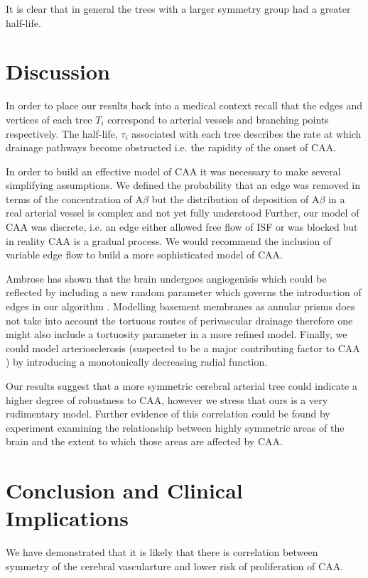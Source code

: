 \documentclass[10pt]{amsart} %
\theoremstyle{definition}
\begin{document}
It is clear that in general the trees with a larger symmetry group had a greater half-life.

\section{Discussion}

In order to place our results back into a medical context recall that the edges and vertices of each tree $T_i$ correspond to arterial vessels and branching points respectively.  The half-life, $\tau_i$ associated with each tree describes the rate at which drainage pathways become obstructed i.e. the rapidity of the onset of CAA.  

In order to build an effective model of CAA it was necessary to make several simplifying assumptions.  We defined the probability that an edge was removed in terms of the concentration of A$\beta$ but the distribution of deposition of A$\beta$ in a real arterial vessel is complex and not yet fully understood %
Further, our model of CAA was discrete, i.e. an edge either allowed free flow of ISF or was blocked but in reality CAA is a gradual process.  We would recommend the inclusion of variable edge flow to build a more sophisticated model of CAA. 

Ambrose has shown that the brain undergoes angiogenisis which could be reflected by including a new random parameter which governs the introduction of edges in our algorithm \cite{ambrose}.   Modelling basement membranes as annular prisms does not take into account the tortuous routes of perivascular drainage therefore one might also include a tortuosity parameter in a more refined model.  Finally, we could model arteriosclerosis (suspected to be a major contributing factor to CAA \cite{wellerperi})  by 
introducing a monotonically decreasing radial function. 

Our results suggest that a more symmetric cerebral arterial tree could indicate a higher degree of robustness to CAA, however we stress that ours is a very rudimentary model.  Further evidence of this correlation could be found by experiment examining the relationship between highly symmetric areas of the brain and the extent to which those areas are affected by CAA. 

\section{Conclusion and Clinical Implications}

We have demonstrated that it is likely that there is correlation between symmetry of the cerebral vascularture and lower risk of proliferation of CAA.  




{}
\end{document}
